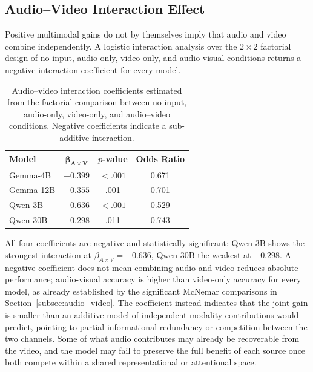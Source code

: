 \subsection*{Audio--Video Interaction Effect}
\label{subsec:interaction_effect}
Positive multimodal gains do not by themselves imply that audio and video combine independently. A logistic interaction analysis over the $2\times2$ factorial design of no-input, audio-only, video-only, and audio-visual conditions returns a negative interaction coefficient for every model.
\begin{table}[ht]
    \centering
    \small
    \begin{tabular}{lccc}
        \hline
        \textbf{Model} &
        $\boldsymbol{\beta_{A \times V}}$ &
        \textbf{$p$-value} &
        \textbf{Odds Ratio} \\
        \hline
        Gemma-4B    &
        $-0.399$ &
        $< .001$ &
        0.671 \\
        
        Gemma-12B &
        $-0.355$ &
        .001 &
        0.701 \\
        
        Qwen-3B &
        $-0.636$ &
        $< .001$ &
        0.529 \\
        
        Qwen-30B &
        $-0.298$ &
        .011 &
        0.743 \\
        \hline
    \end{tabular}
    \caption{Audio--video interaction coefficients estimated from the factorial comparison between no-input, audio-only, video-only, and audio--video conditions. Negative coefficients indicate a sub-additive interaction.}
    \label{tab:audio_video_interaction}
\end{table}
All four coefficients are negative and statistically significant: Qwen-3B shows the strongest interaction at $\beta_{A \times V}=-0.636$, Qwen-30B the weakest at $-0.298$. A negative coefficient does not mean combining audio and video reduces absolute performance; audio-visual accuracy is higher than video-only accuracy for every model, as already established by the significant McNemar comparisons in Section~\ref{subsec:audio_video}. The coefficient instead indicates that the joint gain is smaller than an additive model of independent modality contributions would predict, pointing to partial informational redundancy or competition between the two channels. Some of what audio contributes may already be recoverable from the video, and the model may fail to preserve the full benefit of each source once both compete within a shared representational or attentional space.
